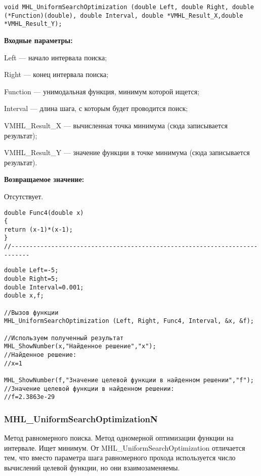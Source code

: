 \documentclass[a4paper,12pt]{article}
\begin{document}
\begin{lstlisting}[label=code_syntax_MHL_UniformSearchOptimization,caption=Синтаксис]
void MHL_UniformSearchOptimization (double Left, double Right, double (*Function)(double), double Interval, double *VMHL_Result_X,double *VMHL_Result_Y);
\end{lstlisting}

\textbf{Входные параметры:}

 Left --- начало интервала поиска;
 
Right --- конец интервала поиска;
 
Function --- унимодальная функция, минимум которой ищется;
 
Interval --- длина шага, с которым будет проводится поиск;
 
VMHL\_Result\_X --- вычисленная точка минимума (сюда записывается результат);
 
VMHL\_Result\_Y --- значение функции в точке минимума (сюда записывается результат).

\textbf{Возвращаемое значение:}
 
 Отсутствует.

\begin{lstlisting}[caption=Оптимизируемая функция]
double Func4(double x)
{
return (x-1)*(x-1);
}
//---------------------------------------------------------------------------
\end{lstlisting}


\begin{lstlisting}[label=code_use_MHL_UniformSearchOptimization,caption=Пример использования]
double Left=-5;
double Right=5;
double Interval=0.001;
double x,f;

//Вызов функции
MHL_UniformSearchOptimization (Left, Right, Func4, Interval, &x, &f);

//Используем полученный результат
MHL_ShowNumber(x,"Найденное решение","x");
//Найденное решение:
//x=1

MHL_ShowNumber(f,"Значение целевой функции в найденном решении","f");
//Значение целевой функции в найденном решении:
//f=2.3863e-29
\end{lstlisting}

\subsubsection{MHL\_UniformSearchOptimizationN}\label{MHL_UniformSearchOptimizationN}

Метод равномерного поиска. Метод одномерной оптимизации функции на интервале. Ищет минимум. От MHL\_UniformSearchOptimization отличается тем, что вместо параметра шага равномерного прохода используется число вычислений целевой функции, но они взаимозаменяемы.
\end{document}
